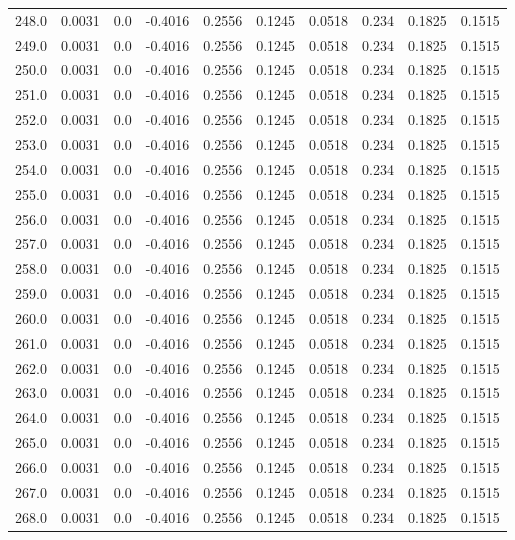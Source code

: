 \begin{longtable}{lrrrrrrrrr}
248.0 & 0.0031 & 0.0 & -0.4016 & 0.2556 & 0.1245 & 0.0518 & 0.234 & 0.1825 & 0.1515 \\
249.0 & 0.0031 & 0.0 & -0.4016 & 0.2556 & 0.1245 & 0.0518 & 0.234 & 0.1825 & 0.1515 \\
250.0 & 0.0031 & 0.0 & -0.4016 & 0.2556 & 0.1245 & 0.0518 & 0.234 & 0.1825 & 0.1515 \\
251.0 & 0.0031 & 0.0 & -0.4016 & 0.2556 & 0.1245 & 0.0518 & 0.234 & 0.1825 & 0.1515 \\
252.0 & 0.0031 & 0.0 & -0.4016 & 0.2556 & 0.1245 & 0.0518 & 0.234 & 0.1825 & 0.1515 \\
253.0 & 0.0031 & 0.0 & -0.4016 & 0.2556 & 0.1245 & 0.0518 & 0.234 & 0.1825 & 0.1515 \\
254.0 & 0.0031 & 0.0 & -0.4016 & 0.2556 & 0.1245 & 0.0518 & 0.234 & 0.1825 & 0.1515 \\
255.0 & 0.0031 & 0.0 & -0.4016 & 0.2556 & 0.1245 & 0.0518 & 0.234 & 0.1825 & 0.1515 \\
256.0 & 0.0031 & 0.0 & -0.4016 & 0.2556 & 0.1245 & 0.0518 & 0.234 & 0.1825 & 0.1515 \\
257.0 & 0.0031 & 0.0 & -0.4016 & 0.2556 & 0.1245 & 0.0518 & 0.234 & 0.1825 & 0.1515 \\
258.0 & 0.0031 & 0.0 & -0.4016 & 0.2556 & 0.1245 & 0.0518 & 0.234 & 0.1825 & 0.1515 \\
259.0 & 0.0031 & 0.0 & -0.4016 & 0.2556 & 0.1245 & 0.0518 & 0.234 & 0.1825 & 0.1515 \\
260.0 & 0.0031 & 0.0 & -0.4016 & 0.2556 & 0.1245 & 0.0518 & 0.234 & 0.1825 & 0.1515 \\
261.0 & 0.0031 & 0.0 & -0.4016 & 0.2556 & 0.1245 & 0.0518 & 0.234 & 0.1825 & 0.1515 \\
262.0 & 0.0031 & 0.0 & -0.4016 & 0.2556 & 0.1245 & 0.0518 & 0.234 & 0.1825 & 0.1515 \\
263.0 & 0.0031 & 0.0 & -0.4016 & 0.2556 & 0.1245 & 0.0518 & 0.234 & 0.1825 & 0.1515 \\
264.0 & 0.0031 & 0.0 & -0.4016 & 0.2556 & 0.1245 & 0.0518 & 0.234 & 0.1825 & 0.1515 \\
265.0 & 0.0031 & 0.0 & -0.4016 & 0.2556 & 0.1245 & 0.0518 & 0.234 & 0.1825 & 0.1515 \\
266.0 & 0.0031 & 0.0 & -0.4016 & 0.2556 & 0.1245 & 0.0518 & 0.234 & 0.1825 & 0.1515 \\
267.0 & 0.0031 & 0.0 & -0.4016 & 0.2556 & 0.1245 & 0.0518 & 0.234 & 0.1825 & 0.1515 \\
268.0 & 0.0031 & 0.0 & -0.4016 & 0.2556 & 0.1245 & 0.0518 & 0.234 & 0.1825 & 0.1515 \\

\end{longtable}
